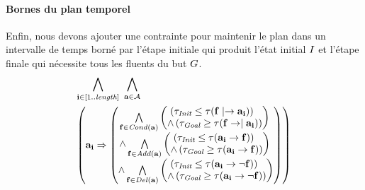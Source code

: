 \paragraph*{Bornes du plan temporel}
Enfin, nous devons ajouter une contrainte pour maintenir le plan dans un intervalle de temps borné par l'étape initiale qui produit l'état initial $I$ et l'étape finale qui nécessite tous les fluents du but $G$.
\begin{small}
\begin{multline*}
~\\[-2em]
\bigwedge\limits_{\substack{\mathbf{i}\in [1..\mathbf{\length}]}}~\bigwedge\limits_{\substack{\mathbf{\a}\in \mathbf{\A}}}\hfill\\
\left(\mathbf{\a}_{\mathbf{i}} \Rightarrow \begin{pmatrix}\bigwedge\limits_{\substack{\mathbf{\f}\in \cond{\mathbf{\a}}}} \begin{pmatrix}\left(\tau_{\textit{Init}} \leq \tau(\mathbf{\f}\mid\rightarrow\mathbf{\a}_\mathbf{i}) \right)\hfill\\%
 \wedge \left(\tau_{\textit{Goal}} \geq \tau(\mathbf{f}\rightarrow\mid\mathbf{\a}_\mathbf{i})\right) \end{pmatrix}\hfill\\
 \wedge \bigwedge\limits_{\substack{\mathbf{\f}\in \add{\mathbf{\a}}}} \begin{pmatrix}\left(\tau_{\textit{Init}} \leq \tau(\mathbf{\a}_\mathbf{i}\rightarrow \mathbf{\f}) \right)\hfill\\%
 \wedge \left(\tau_{\textit{Goal}} \geq \tau(\mathbf{\a}_\mathbf{i}\rightarrow \mathbf{f})\right) \end{pmatrix}\hfill\\
 \wedge \bigwedge\limits_{\substack{\mathbf{\f}\in \del{\mathbf{\a}}}} \begin{pmatrix}\left(\tau_{\textit{Init}} \leq \tau(\mathbf{\a}_\mathbf{i}\rightarrow \neg \mathbf{\f}) \right)\hfill\\%
 \wedge \left(\tau_{\textit{Goal}} \geq \tau(\mathbf{\a}_\mathbf{i}\rightarrow \neg \mathbf{\f})\right) \end{pmatrix} \end{pmatrix}\right)\\[1em]
\end{multline*}
\end{small}


